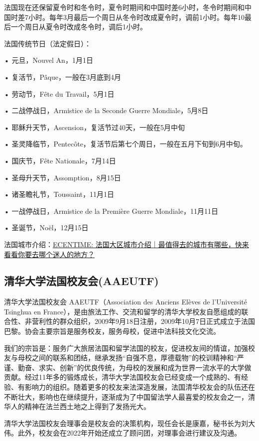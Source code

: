 \documentclass[UTF8]{ctexart}
\begin{document}
法国现在还保留夏令时和冬令时，夏令时期间和中国时差6小时，冬令时期间和中国时差7小时。每年3月最后一个周日从冬令时改成夏令时，调前1小时。每年10最后一个周日从夏令时改成冬令时，调后1小时。

法国传统节日（法定假日）：

• 元旦，Nouvel An，1月1日

• 复活节，Pâque，一般在3月底到4月

• 劳动节，Fête du Travail，5月1日

• 二战停战日，Armistice de la Seconde Guerre Mondiale，5月8日

• 耶稣升天节，Ascension，复活节过40天，一般在5月中旬

• 圣灵降临节，Pentecôte，复活节后第七个周日，一般在五月下旬到6月中旬。

• 国庆节，Fête Nationale，7月14日

• 圣母升天节，Assomption，8月15日

• 诸圣瞻礼节，Toussaint，11月1日

• 一战停战日，Armistice de la Première Guerre Mondiale，11月11日

• 圣诞节，Noël，12月15日

法国城市介绍：\href{https://www.ecentime.com/article/-france-geographie}{ECENTIME: 法国大区城市介绍｜最值得去的城市有哪些，快来看看你要去哪个迷人的地方？} 

\subsection{清华大学法国校友会(AAEUTF)}

清华大学法国校友会 AAEUTF（Association des Anciens Elèves de l’Université Tsinghua en France），是由旅法工作、交流和留学的清华大学校友自愿组成的联合性、非营利性的群众组织，2009年9月18日注册，2009年10月7日正式成立于法国巴黎。协会主要宗旨是服务校友，服务母校，促进中法科技文化交流。

我们的宗旨是：服务广大旅居法国和留学法国的校友，促进校友间的情谊，加强校友与母校之间的联系和团结，继承发扬“自强不息，厚德载物”的校训精神和“严谨、勤奋、求实、创新”的优良传统，为母校的发展和成为世界一流水平的大学做贡献。经过11年多的锻炼成长，清华大学法国校友会已经变成一个成熟的、有经验、有影响力的组织。随着更多的校友来法深造发展，法国清华校友会的队伍还在不断壮大，影响也在继续提升，逐渐成为了中国留法学人最喜爱的校友会之一，清华人的精神在法兰西土地之上得到了发扬光大。

清华大学法国校友会理事会是校友会的决策机构，现任会长是康嘉，秘书长为刘大伟。此外，校友会在2022年开始还成立了顾问团，对理事会进行建议及沟通。
\end{document}
